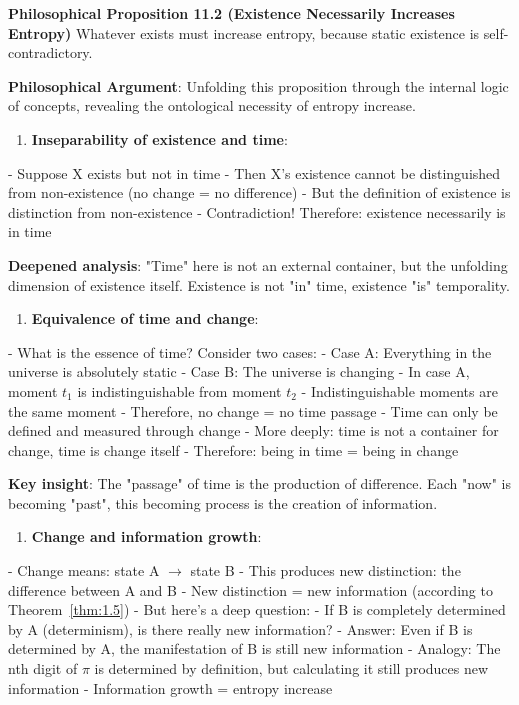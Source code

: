 \textbf{Philosophical Proposition 11.2 (Existence Necessarily Increases Entropy)}
Whatever exists must increase entropy, because static existence is self-contradictory.

\textbf{Philosophical Argument}:
Unfolding this proposition through the internal logic of concepts, revealing the ontological necessity of entropy increase.

\begin{enumerate}
\item \textbf{Inseparability of existence and time}:
\end{enumerate}
   - Suppose X exists but not in time
   - Then X's existence cannot be distinguished from non-existence (no change = no difference)
   - But the definition of existence is distinction from non-existence
   - Contradiction! Therefore: existence necessarily is in time
   
   \textbf{Deepened analysis}: "Time" here is not an external container,
   but the unfolding dimension of existence itself.
   Existence is not "in" time, existence "is" temporality.

\begin{enumerate}
\item \textbf{Equivalence of time and change}:
\end{enumerate}
   - What is the essence of time? Consider two cases:
   - Case A: Everything in the universe is absolutely static
   - Case B: The universe is changing
   - In case A, moment $t_1$ is indistinguishable from moment $t_2$
   - Indistinguishable moments are the same moment
   - Therefore, no change = no time passage
   - Time can only be defined and measured through change
   - More deeply: time is not a container for change, time is change itself
   - Therefore: being in time = being in change
   
   \textbf{Key insight}: The "passage" of time is the production of difference.
   Each "now" is becoming "past",
   this becoming process is the creation of information.

\begin{enumerate}
\item \textbf{Change and information growth}:
\end{enumerate}
   - Change means: state A $\rightarrow$ state B
   - This produces new distinction: the difference between A and B
   - New distinction = new information (according to Theorem~\ref{thm:1.5})
   - But here's a deep question:
     - If B is completely determined by A (determinism), is there really new information?
     - Answer: Even if B is determined by A, the manifestation of B is still new information
     - Analogy: The nth digit of $\pi$ is determined by definition, but calculating it still produces new information
   - Information growth = entropy increase
   
